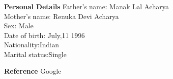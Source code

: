 \documentclass{article}
\begin{document}
	      
	      \begin{flushleft}
	      	\vspace{0.4in}
	      	\textbf{Personal Details} \hspace{0.36in}Father's name: \hspace{0.13in} Manak Lal Acharya \\
	      	\hspace{1.55in}Mother's name: \hspace{0.08in} Renuka Devi Acharya\\
	      	\hspace{1.55in}Sex:\hspace{0.85in} Male\\
	      	\hspace{1.55in}Date of birth:\hspace{0.255in} July,11 1996	\\
	      	\hspace{1.55in}Nationality:\hspace{0.45in}Indian\\
	      	\hspace{1.55in}Marital status:\hspace{0.28in}Single
	      	
	      \end{flushleft}
	      
	      
	      \begin{flushleft}
	      	\vspace{0.4in}
	      	\textbf{Reference} \hspace{0.75in} Google
	      \end{flushleft}
	      
	      
	
\end{document}
